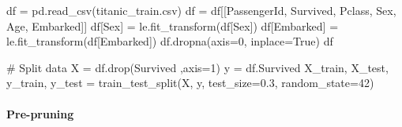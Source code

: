 \documentclass[
  letterpaper,
  DIV=11,
  numbers=noendperiod]{scrartcl}
\let\oldparagraph\paragraph
\renewcommand{\paragraph}[1]{\oldparagraph{#1}\mbox{}}
\newenvironment{Shaded}{\begin{snugshade}}{\end{snugshade}}
\newcommand{\CommentTok}[1]{\textcolor[rgb]{0.37,0.37,0.37}{#1}}
\newcommand{\DecValTok}[1]{\textcolor[rgb]{0.68,0.00,0.00}{#1}}
\newcommand{\FloatTok}[1]{\textcolor[rgb]{0.68,0.00,0.00}{#1}}
\newcommand{\NormalTok}[1]{\textcolor[rgb]{0.00,0.23,0.31}{#1}}
\newcommand{\OperatorTok}[1]{\textcolor[rgb]{0.37,0.37,0.37}{#1}}
\newcommand{\StringTok}[1]{\textcolor[rgb]{0.13,0.47,0.30}{#1}}
\newcommand{\VariableTok}[1]{\textcolor[rgb]{0.07,0.07,0.07}{#1}}
\begin{document}
\begin{Shaded}
\begin{Highlighting}[]
\NormalTok{df }\OperatorTok{=}\NormalTok{ pd.read\_csv(}\StringTok{\textquotesingle{}titanic\_train.csv\textquotesingle{}}\NormalTok{)}
\NormalTok{df }\OperatorTok{=}\NormalTok{ df[[}\StringTok{\textquotesingle{}PassengerId\textquotesingle{}}\NormalTok{, }\StringTok{\textquotesingle{}Survived\textquotesingle{}}\NormalTok{, }\StringTok{\textquotesingle{}Pclass\textquotesingle{}}\NormalTok{, }\StringTok{\textquotesingle{}Sex\textquotesingle{}}\NormalTok{, }\StringTok{\textquotesingle{}Age\textquotesingle{}}\NormalTok{, }\StringTok{\textquotesingle{}Embarked\textquotesingle{}}\NormalTok{]]}
\NormalTok{df[}\StringTok{\textquotesingle{}Sex\textquotesingle{}}\NormalTok{] }\OperatorTok{=}\NormalTok{ le.fit\_transform(df[}\StringTok{\textquotesingle{}Sex\textquotesingle{}}\NormalTok{])}
\NormalTok{df[}\StringTok{\textquotesingle{}Embarked\textquotesingle{}}\NormalTok{] }\OperatorTok{=}\NormalTok{ le.fit\_transform(df[}\StringTok{\textquotesingle{}Embarked\textquotesingle{}}\NormalTok{])}
\NormalTok{df.dropna(axis}\OperatorTok{=}\DecValTok{0}\NormalTok{, inplace}\OperatorTok{=}\VariableTok{True}\NormalTok{)}
\NormalTok{df}
\end{Highlighting}
\end{Shaded}

\begin{Shaded}
\begin{Highlighting}[]
\CommentTok{\# Split data}
\NormalTok{X }\OperatorTok{=}\NormalTok{ df.drop(}\StringTok{\textquotesingle{}Survived\textquotesingle{}}\NormalTok{ ,axis}\OperatorTok{=}\DecValTok{1}\NormalTok{)}
\NormalTok{y }\OperatorTok{=}\NormalTok{ df.Survived}
\NormalTok{X\_train, X\_test, y\_train, y\_test }\OperatorTok{=}\NormalTok{ train\_test\_split(X, y, test\_size}\OperatorTok{=}\FloatTok{0.3}\NormalTok{, random\_state}\OperatorTok{=}\DecValTok{42}\NormalTok{)}
\end{Highlighting}
\end{Shaded}

\paragraph{Pre-pruning}\label{pre-pruning-1}
\end{document}
